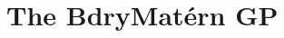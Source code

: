 \documentclass[aos,preprint]{imsart}
\theoremstyle{plain}
\newcommand{\cmtS}[1]{{\color{red}{(Simon: #1)}}}
\theoremstyle{remark}
\begin{document}



\section{The BdryMat\'ern GP}
\label{sec:Bdrymat_SPDE}
\end{document}
